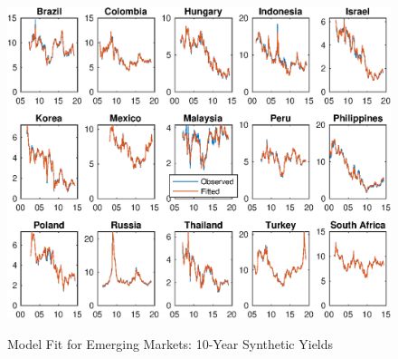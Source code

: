 \documentclass{article}
\begin{document}
\begin{figure}[tbph]
	\begin{center}
		\caption{Model Fit for Emerging Markets: 10-Year Synthetic Yields}
		\label{fig:s_ylds_ssb_yQ}
		\includegraphics[trim={0cm 0cm 0cm 0cm},clip,height=1\textheight,width=1.4\textwidth]{../Figures/Estimation/s_ylds_ssb_yQ.eps} \\
	\end{center}
\end{figure}
\end{document}
